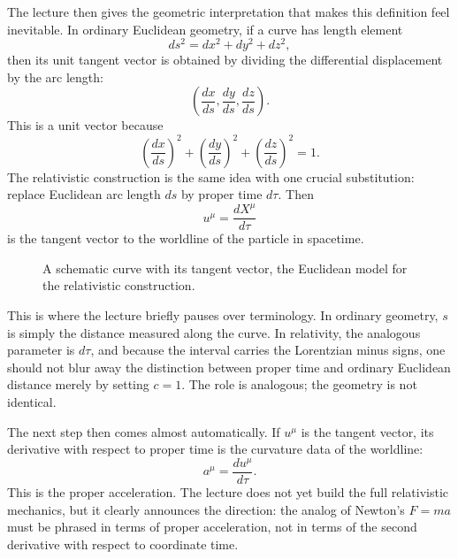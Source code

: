The lecture then gives the geometric interpretation that makes this definition feel inevitable. In ordinary Euclidean geometry, if a curve has length element
\begin{equation}
ds^2 = dx^2 + dy^2 + dz^2,
\end{equation}
then its unit tangent vector is obtained by dividing the differential displacement by the arc length:
\begin{equation}
\left(
\frac{dx}{ds},
\frac{dy}{ds},
\frac{dz}{ds}
\right).
\end{equation}
This is a unit vector because
\begin{equation}
\left(\frac{dx}{ds}\right)^2
+
\left(\frac{dy}{ds}\right)^2
+
\left(\frac{dz}{ds}\right)^2
=
1.
\end{equation}
The relativistic construction is the same idea with one crucial substitution: replace Euclidean arc length \(ds\) by proper time \(d\tau\). Then
\begin{equation}
u^\mu=\frac{dX^\mu}{d\tau}
\end{equation}
is the tangent vector to the worldline of the particle in spacetime.

\begin{figure}[htbp]
\centering
{}
\caption{A schematic curve with its tangent vector, the Euclidean model for the relativistic construction.}
\end{figure}

This is where the lecture briefly pauses over terminology. In ordinary geometry, \(s\) is simply the distance measured along the curve. In relativity, the analogous parameter is \(d\tau\), and because the interval carries the Lorentzian minus signs, one should not blur away the distinction between proper time and ordinary Euclidean distance merely by setting \(c=1\). The role is analogous; the geometry is not identical.

The next step then comes almost automatically. If \(u^\mu\) is the tangent vector, its derivative with respect to proper time is the curvature data of the worldline:
\begin{equation}
a^\mu = \frac{du^\mu}{d\tau}.
\end{equation}
This is the proper acceleration. The lecture does not yet build the full relativistic mechanics, but it clearly announces the direction: the analog of Newton's \(F=ma\) must be phrased in terms of proper acceleration, not in terms of the second derivative with respect to coordinate time.

